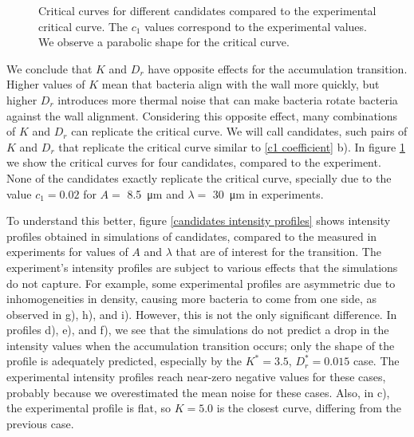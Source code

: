 \begin{figure}
\centering

\caption[Comparison of the accumulation transition curves for different values of $K$ and $D_r$]{Critical curves for different candidates compared to the experimental critical curve. The $c_1$ values correspond to the experimental values. We observe a parabolic shape for the critical curve. }
\label{c1_candidates}
\end{figure}


We conclude that $K$ and $D_r$ have opposite effects for the accumulation transition. Higher values of $K$ mean that bacteria align with the wall more quickly, but higher $D_r$ introduces more thermal noise that can make bacteria rotate bacteria against the wall alignment. Considering this opposite effect, many combinations of $K$ and $D_r$ can replicate the critical curve. We will call candidates, such pairs of $K$ and $D_r$ that replicate the critical curve similar to \ref{c1 coefficient} b). In figure \ref{c1_candidates} we show the critical curves for four candidates, compared to the experiment. None of the candidates exactly replicate the critical curve, specially due to the value $c_1=0.02$ for $A=$ \SI{8.5}{\micro\meter} and $\lambda= $ \SI{30}{\micro\meter} in experiments.

To understand this better, figure \ref{candidates intensity profiles} shows intensity profiles obtained in simulations of candidates, compared to the measured in experiments for values of $A$ and $\lambda$ that are of interest for the transition. The experiment's intensity profiles are subject to various effects that the simulations do not capture. For example, some experimental profiles are asymmetric due to inhomogeneities in density, causing more bacteria to come from one side, as observed in g), h), and i). However, this is not the only significant difference. In profiles d), e), and f), we see that the simulations do not predict a drop in the intensity values when the accumulation transition occurs; only the shape of the profile is adequately predicted, especially by the $K^*=3.5$, $D_r^*=0.015$ case. The experimental intensity profiles reach near-zero negative values for these cases, probably because we overestimated the mean noise for these cases. Also, in c), the experimental profile is flat, so $K=5.0$ is the closest curve, differing from the previous case.

